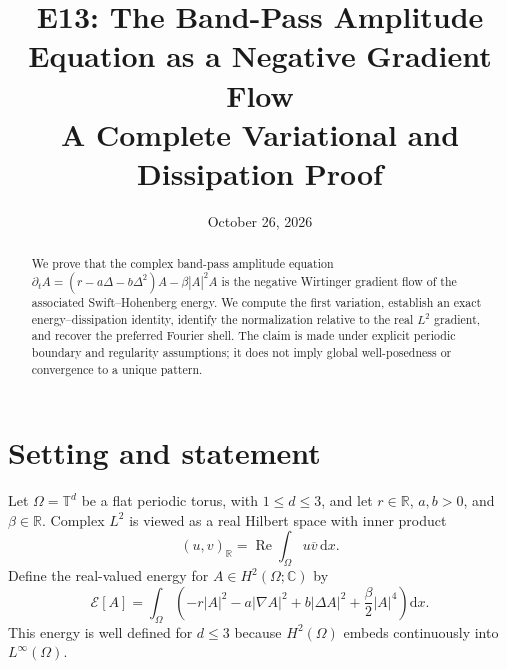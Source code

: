 \documentclass[11pt]{article}
\title{E13: The Band-Pass Amplitude Equation as a Negative Gradient Flow\\
\large A Complete Variational and Dissipation Proof}
\author{}
\date{October 26, 2026}
\newcommand{\Om}{\Omega}
\newcommand{\E}{\mathcal E}
\newcommand{\dd}{\mathrm d}
\newcommand{\Real}{\operatorname{Re}}
\begin{document}
\maketitle

\begin{abstract}
We prove that the complex band-pass amplitude equation
\(
\partial_t A=(r-a\Delta-b\Delta^2)A-\beta|A|^2A
\)
is the negative Wirtinger gradient flow of the associated Swift--Hohenberg
energy.  We compute the first variation, establish an exact energy--dissipation
identity, identify the normalization relative to the real $L^2$ gradient,
and recover the preferred Fourier shell.  The claim is made under explicit
periodic boundary and regularity assumptions; it does not imply global
well-posedness or convergence to a unique pattern.
\end{abstract}

\section{Setting and statement}
Let $\Om=\mathbb T^d$ be a flat periodic torus, with $1\leq d\leq3$,
and let $r\in\mathbb R$, $a,b>0$, and $\beta\in\mathbb R$.  Complex
$L^2$ is viewed as a real Hilbert space with inner product
\begin{equation}\label{eq:realinner}
 (u,v)_{\mathbb R}=\Real\int_\Om u\overline v\,\dd x.
\end{equation}
Define the real-valued energy for $A\in H^2(\Om;\mathbb C)$ by
\begin{equation}\label{eq:energy}
 \E[A]=\int_\Om\left(-r|A|^2-a|\nabla A|^2
             +b|\Delta A|^2+\frac\beta2|A|^4\right)\dd x.
\end{equation}
This energy is well defined for $d\leq3$ because $H^2(\Om)$ embeds
continuously into $L^\infty(\Om)$.
\end{document}
